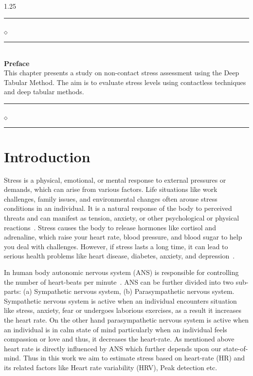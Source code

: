 \begin{spacing}{1.25}
\vskip 20pt
\noindent
\rule{0.49\textwidth}{0.75pt} $_{\Diamond}$ \rule{0.49\textwidth}{0.75pt}\\
{\Large{\textbf{Preface}}}\\
This chapter presents a study on non-contact stress assessment using the Deep Tabular Method. The aim is to evaluate stress levels using contactless techniques and  deep tabular methods.\\
\rule{0.49\textwidth}{0.75pt} $_{\Diamond}$ \rule{0.49\textwidth}{0.75pt}
\end{spacing}
\newpage








\section{Introduction}\label{}
Stress is a physical, emotional, or mental response to external pressures or demands, which can arise from various 
 factors. Life situations like work challenges, family issues, and  environmental changes often arouse stress conditions in an individual. It is a natural response of the body to perceived threats and can manifest as tension, anxiety, or other psychological or physical reactions~\cite{giannakakis2019review}. Stress causes the body to release hormones like cortisol and adrenaline, which raise your heart rate, blood pressure, and blood sugar to help you deal with challenges. However, if stress lasts a long time, it can lead to serious health problems like heart disease, diabetes, anxiety, and depression~\cite{fink2010stress}.

In  human body autonomic nervous system (ANS) is responsible for controlling the number of heart-beats per minute~\cite{barazi2021dissecting}. ANS can be further divided into two sub-parts: (a) Sympathetic nervous system, 
  (b) Parasympathetic nervous system.
    Sympathetic  nervous system is active when an individual encounters situation like stress, anxiety, fear or undergoes laborious exercises, as a result it increases the heart rate. On the other hand parasympathetic nervous system is active when an individual is in calm state of mind particularly when an individual  feels compassion or love and thus, it decreases the heart-rate. As mentioned above heart rate is directly influenced by ANS which further depends upon our state-of-mind. Thus in this work we aim to estimate stress based on heart-rate (HR) and its related factors like  Heart rate variability (HRV), Peak detection etc.

